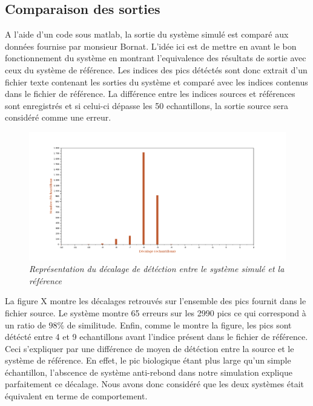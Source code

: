\documentclass[a4paper,12pt]{article}
\begin{document}
\subsection{Comparaison des sorties}
A l'aide d'un code sous matlab, la sortie du système simulé est comparé aux données fournise par monsieur Bornat.
L'idée ici est de mettre en avant le bon fonctionnement du système en montrant l'equivalence des résultats de sortie avec ceux du système de référence.
Les indices des pics détéctés sont donc extrait d'un fichier texte contenant les sorties du système et comparé avec les indices contenus dans le fichier de référence.
La différence entre les indices sources et références sont enregistrés et si celui-ci dépasse les 50 echantillons, la sortie source sera considéré comme une erreur. 
\begin{figure}[H]
	\centering
	\includegraphics[scale=0.3, keepaspectratio]{ResultatSim.png}
	\caption{\textit{Représentation du décalage de détéction entre le système simulé et la référence}}
\end{figure}
La figure X montre les décalages retrouvés sur l'ensemble des pics fournit dans le fichier source. Le système montre 65 erreurs sur les 2990 pics ce qui correspond à un ratio de $98\%$ de similitude.
Enfin, comme le montre la figure, les pics sont détécté entre 4 et 9 echantillons avant l'indice présent dans le fichier de référence. Ceci s'expliquer par une différence de moyen de détéction entre la source et le système de référence.
En effet, le pic biologique étant plus large qu'un simple échantillon, l'abscence de système anti-rebond dans notre simulation explique parfaitement ce décalage.
Nous avons donc considéré que les deux systèmes était équivalent en terme de comportement.
\newpage
\end{document}
